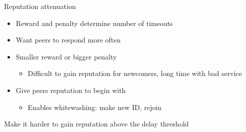\documentclass[presentation,english,usenames,dvipsnames]{beamer}
\begin{document}
\begin{frame}{Reputation attenuation}
  \begin{itemize}
    \item Reward and penalty determine number of timeouts
    \item Want peers to respond more often
    \item Smaller reward or bigger penalty

    \pause

    \begin{itemize}
      \item Difficult to gain reputation for newcomers, long time with bad
            service
    \end{itemize}

    \pause

    \item Give peers reputation to begin with

    \pause

    \begin{itemize}
      \item Enables whitewashing: make new ID, rejoin
    \end{itemize}

    \pause

  \end{itemize}
  \begin{block}{}
    Make it harder to gain reputation above the delay threshold
  \end{block}
\end{frame}
\end{document}
